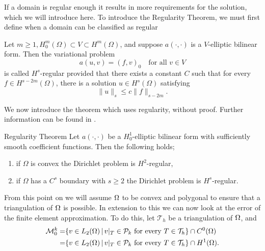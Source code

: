 If a domain is regular enough it results in more requirements for the solution, which 
we will introduce here.
To introduce the Regularity Theorem, we must first define when a domain can be classified as regular

\begin{defn}{\quad\label{defn:7.1}}
    Let $m\geq 1, H^m_0(\Omega)\subset V\subset H^m(\Omega)$, and suppose $a(\cdot,\cdot)$ is a $V$-elliptic bilinear form. 
    Then the variational problem
    \begin{equation}
        a(u,v) = {(f,v)}_0\quad \text{for all } v\in V
    \end{equation}
    is called $H^s$-regular provided that there exists a constant $C$ such that for every  $f\in H^{s-2m}(\Omega)$,
    there is a solution $u\in H^s(\Omega)$ satisfying
    \begin{equation}
        \|u\|_s\leq c\|f\|_{s-2m}.
    \end{equation}
\end{defn}
We now introduce the theorem which uses regularity, without proof. Further information can be found in \cite{Braess}.
\begin{thmx}{Regularity Theorem}
    Let $a(\cdot,\cdot)$ be a $H^1_0$-elliptic bilinear form with sufficiently smooth coefficient functions. Then the following holds; 
    \begin{enumerate}
        \item if $\Omega$ is convex the Dirichlet problem is $H^2$-regular, 
        \item if $\Omega$ has a $C^s$ boundary with $s\geq 2$ the Dirichlet problem is $H^s$-regular.
    \end{enumerate}
\end{thmx}


From this point on we will assume $\Omega$ to be convex and polygonal to ensure that a triangulation of $\Omega$ is possible. 
In extension to this we can now look at the error of the finite element approximation.
To do this, let $\mathcal{T}_h$ be a triangulation of $\Omega$, and
\begin{align*}
    \mathcal{M}^k_0 =& \{ v \in L_2(\Omega) \,|\, v|_T \in \mathcal{P}_k \text{ for every } T \in \mathcal{T}_h \} \cap C^0(\Omega) \\
    =& \{ v \in L_2(\Omega) \,|\, v|_T \in \mathcal{P}_k \text{ for every } T \in \mathcal{T}_h \} \cap H^1(\Omega) .
\end{align*}

